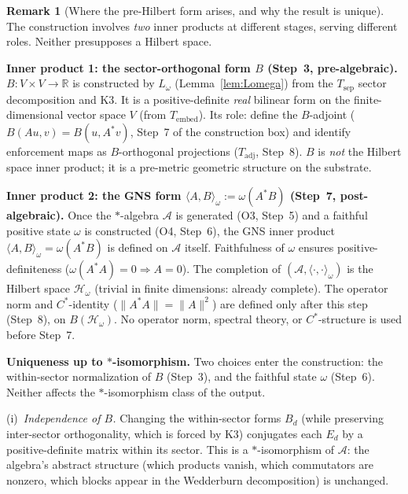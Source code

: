 \documentclass[11pt,a4paper]{article}
\theoremstyle{definition}
\newtheorem{remark}[theorem]{Remark}
\begin{document}
\begin{remark}[Where the pre-Hilbert form arises, and why the result is unique]\label{rem:preHilbert}
The construction involves \emph{two} inner products at different stages, serving different roles.  Neither presupposes a Hilbert space.

\smallskip\noindent\textbf{Inner product 1: the sector-orthogonal form $B$ (Step~3, pre-algebraic).}  $B: V \times V \to \mathbb{R}$ is constructed by $L_\omega$ (Lemma~\ref{lem:Lomega}) from the $T_{\mathrm{sep}}$ sector decomposition and K3.  It is a positive-definite \emph{real} bilinear form on the finite-dimensional vector space $V$ (from $T_{\mathrm{embed}}$).  Its role: define the $B$-adjoint ($B(Au, v) = B(u, A^*v)$, Step~7 of the construction box) and identify enforcement maps as $B$-orthogonal projections ($T_{\mathrm{adj}}$, Step~8).  $B$ is \emph{not} the Hilbert space inner product; it is a pre-metric geometric structure on the substrate.

\smallskip\noindent\textbf{Inner product 2: the GNS form $\langle A, B\rangle_\omega := \omega(A^*B)$ (Step~7, post-algebraic).}  Once the $*$-algebra $\mathcal{A}$ is generated (O3, Step~5) and a faithful positive state $\omega$ is constructed (O4, Step~6), the GNS inner product $\langle A, B\rangle_\omega = \omega(A^*B)$ is defined on $\mathcal{A}$ itself.  Faithfulness of $\omega$ ensures positive-definiteness ($\omega(A^*A) = 0 \Rightarrow A = 0$).  The completion of $(\mathcal{A}, \langle\cdot,\cdot\rangle_\omega)$ is the Hilbert space $\mathcal{H}_\omega$ (trivial in finite dimensions: already complete).  The operator norm and $C^*$-identity ($\|A^*A\| = \|A\|^2$) are defined only after this step (Step~8), on $B(\mathcal{H}_\omega)$.  No operator norm, spectral theory, or $C^*$-structure is used before Step~7.

\smallskip\noindent\textbf{Uniqueness up to $*$-isomorphism.}  Two choices enter the construction: the within-sector normalization of $B$ (Step~3), and the faithful state $\omega$ (Step~6).  Neither affects the $*$-isomorphism class of the output.

\noindent(i)~\textit{Independence of $B$.}  Changing the within-sector forms $B_d$ (while preserving inter-sector orthogonality, which is forced by K3) conjugates each $E_d$ by a positive-definite matrix within its sector.  This is a $*$-isomorphism of $\mathcal{A}$: the algebra's abstract structure (which products vanish, which commutators are nonzero, which blocks appear in the Wedderburn decomposition) is unchanged.


\end{remark}
\end{document}
